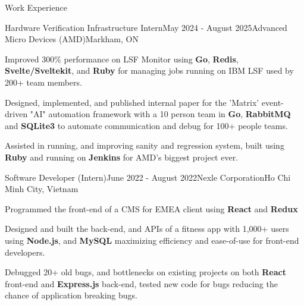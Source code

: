 \documentclass[
	11pt, %
]{resume} %
\begin{document}


\begin{rSection}{Work Experience}

	\begin{rSubsection}{Hardware Verification Infrastructure Intern}{May 2024 - August 2025}{Advanced Micro Devices (AMD)}{Markham, ON}
	\item Improved 300\% performance on LSF Monitor using \textbf{Go}, \textbf{Redis}, \textbf{Svelte/Sveltekit}, and \textbf{Ruby} for managing jobs running on IBM LSF used by 200+ team members.
	\item Designed, implemented, and published internal paper for the 'Matrix' event-driven "AI" automation framework with a 10 person team in \textbf{Go}, \textbf{RabbitMQ} and \textbf{SQLite3} to automate communication and debug for 100+ people teams.
	\item Assisted in running, and improving sanity and regression system, built using \textbf{Ruby} and running on \textbf{Jenkins} for AMD's biggest project ever.
	\end{rSubsection}

	\begin{rSubsection}{Software Developer (Intern)}{June 2022 - August 2022}{Nexle Corporation}{Ho Chi Minh City, Vietnam}
		\item Programmed the front-end of a CMS for EMEA client using \textbf{React} and \textbf{Redux}
		\item Designed and built the back-end, and APIs of a fitness app with 1,000+ users using \textbf{Node.js}, and \textbf{MySQL} maximizing efficiency and ease-of-use for front-end developers.
		\item Debugged 20+ old bugs, and bottlenecks on existing projects on both \textbf{React} front-end and \textbf{Express.js} back-end, tested new code for bugs reducing the chance of application breaking bugs.
	\end{rSubsection}


\end{rSection}
\end{document}
